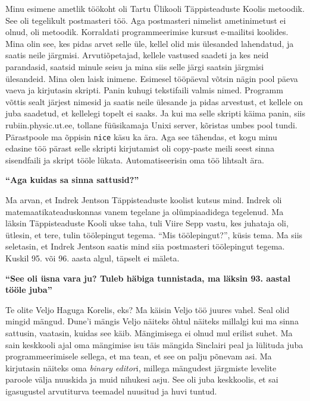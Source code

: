 Minu esimene ametlik töökoht oli Tartu Ülikooli Täppisteaduste Koolis metoodik. See oli tegelikult postmasteri töö. Aga postmasteri nimelist ametinimetust ei olnud, oli metoodik. Korraldati programmeerimise kursust e-mailitsi koolides. Mina olin see, kes pidas arvet selle üle, kellel olid mis ülesanded lahendatud, ja saatis neile järgmisi. Arvutiõpetajad, kellele vastused saadeti ja kes neid parandasid, saatsid minule seisu ja mina siis selle järgi saatsin järgmisi ülesandeid. Mina olen laisk inimene. Esimesel tööpäeval võtsin nägin pool päeva vaeva ja kirjutasin skripti. Panin kuhugi tekstifaili valmis nimed. Programm võttis sealt järjest nimesid ja saatis neile ülesande ja pidas arvestust, et kellele on juba saadetud, et kellelegi topelt ei saaks. Ja kui ma selle skripti käima panin, siis rubiin.physic.ut.ee, tollane füüsikamaja Unixi server, kõristas umbes pool tundi. Pärastpoole ma õppisin \verb|nice| käsu ka ära. Aga see tähendas, et kogu minu edasine töö pärast selle skripti kirjutamist oli copy-paste meili seest sinna sisendfaili ja skript tööle lükata. Automatiseerisin oma töö lihtsalt ära. 

\textbf{\enquote{Aga kuidas sa sinna sattusid?}}

Ma arvan, et Indrek Jentson Täppisteaduste koolist kutsus mind. Indrek oli matemaatikateaduskonnas vanem tegelane ja olümpiaadidega tegelenud. Ma läksin Täppisteaduste Kooli ukse taha, tuli Viire Sepp vastu, kes juhataja oli, ütlesin, et tere, tulin töölepingut tegema. \enquote{Mis töölepingut?}, küsis tema. Ma siis seletasin, et Indrek Jentson saatis mind siia postmasteri töölepingut tegema. Kuskil 95. või 96. aasta algul, täpselt ei mäleta. 

\textbf{\enquote{See oli üsna vara ju? Tuleb häbiga tunnistada, ma läksin 93. aastal tööle juba}}

Te olite Veljo Haguga Korelis, eks? Ma käisin Veljo töö juures vahel. Seal olid mingid mängud. Dune'i mängis Veljo näiteks õhtul näiteks millalgi kui ma sinna sattusin, vaatasin, kuidas see käib. Mängimisega ei olnud mul erilist suhet. Ma sain keskkooli ajal oma mängimise isu täis mängida Sinclairi peal ja lülituda juba programmeerimisele sellega, et ma tean, et see on palju põnevam asi. Ma kirjutasin näiteks oma \emph{binary editor}i, millega mängudest järgmiste levelite paroole välja nuuskida ja muid nihukesi asju. See oli juba keskkoolis, et sai igasugustel arvutiturva teemadel nuusitud ja huvi tuntud. 


